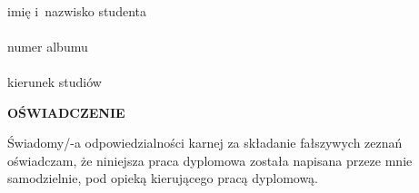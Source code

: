 \documentclass[10pt,twoside,a4paper]{article}
\begin{document}
		\begin{flushleft}
			\begin{minipage}{0.33\linewidth}
				\begin{flushleft}
					\dotfill \\  \vspace{-5pt}
					imię i~nazwisko studenta \\
					\vspace{10pt}
					\dotfill \\  \vspace{-5pt}
					numer albumu \\
					\vspace{10pt}
					\dotfill \\  \vspace{-5pt}
					kierunek studiów
				\end{flushleft}
			\end{minipage}
		\end{flushleft}
		\vspace{15 pt}
		\begin{center}
			{\fontsize{12}{14.5}\textbf{OŚWIADCZENIE}			}
		\end{center}
		Świadomy/-a odpowiedzialności karnej za składanie fałszywych zeznań oświadczam,  
		że niniejsza praca dyplomowa została napisana przeze mnie samodzielnie, pod opieką kierującego pracą dyplomową. 		
		
\end{document}

